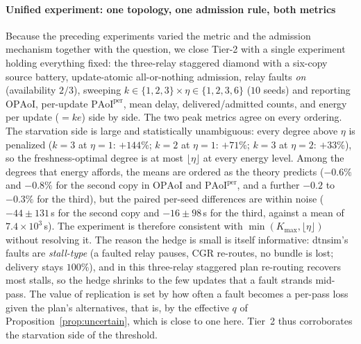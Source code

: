 \documentclass[twocolumn,3p,times,procedia]{elsarticle}
\theoremstyle{plain}
\theoremstyle{remark}
\newcommand{\OPAoI}{\mathrm{OPAoI}}
\newcommand{\PAoIper}{\mathrm{PAoI}^{\mathrm{per}}}
\begin{document}
\paragraph*{Unified experiment: one topology, one admission rule, both
metrics}
Because the preceding experiments varied the metric and the admission
mechanism together with the question, we close Tier-2 with a single
experiment holding everything fixed: the three-relay staggered diamond
with a six-copy source battery, update-atomic all-or-nothing admission, relay faults \emph{on}
(availability $2/3$), sweeping $k\in\{1,2,3\}\times
\eta\in\{1,2,3,6\}$ ($10$ seeds) and reporting $\OPAoI$, per-update
$\PAoIper$, mean delay, delivered/admitted counts, and energy per
update ($=ke$) side by side. The two peak metrics agree on every
ordering. The starvation side is large and statistically unambiguous:
every degree above $\eta$ is penalized ($k{=}3$ at $\eta{=}1$: $+144\%$;
$k{=}2$ at $\eta{=}1$: $+71\%$; $k{=}3$ at $\eta{=}2$: $+33\%$), so the
freshness-optimal degree is at most $\lfloor\eta\rfloor$ at every energy
level. Among the degrees that energy affords, the means are ordered as
the theory predicts ($-0.6\%$ and $-0.8\%$ for the second copy in
$\OPAoI$ and $\PAoIper$, and a further $-0.2$ to $-0.3\%$ for the
third), but the paired
per-seed differences are within noise ($-44\pm131$\,s for the second
copy and $-16\pm98$\,s for the third, against a mean of
$7.4\times10^{3}$\,s). The experiment is therefore consistent with
$\min(K_{\max},\lfloor\eta\rfloor)$ without resolving it. The reason
the hedge is small is itself informative: dtnsim's faults are
\emph{stall-type} (a faulted relay pauses, CGR re-routes, no bundle is
lost; delivery stays $100\%$), and in this three-relay staggered plan
re-routing recovers most stalls, so the hedge shrinks to the few updates
that a fault strands mid-pass. The value of replication is set by how
often a fault becomes a per-pass loss given the plan's
alternatives, that is, by the effective $q$ of
Proposition~\ref{prop:uncertain}, which is close to one here. Tier~2
thus corroborates the starvation side of the threshold.
\end{document}
